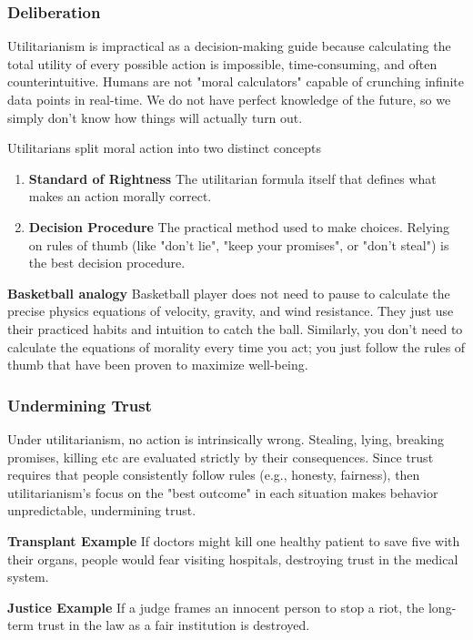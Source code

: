 \documentclass[12pt]{article}
\begin{document}
\subsubsection{Deliberation}
Utilitarianism is impractical as a decision-making guide because calculating the total utility of every possible action is impossible, time-consuming, and often counterintuitive.
Humans are not "moral calculators" capable of crunching infinite data points in real-time.
We do not have perfect knowledge of the future, so we simply don't know how things will actually turn out.

\noindent Utilitarians split moral action into two distinct concepts
\begin{enumerate}
    \item \textbf{Standard of Rightness} The utilitarian formula itself that defines what makes an action morally correct.
    \item \textbf{Decision Procedure} The practical method used to make choices. Relying on rules of thumb (like "don't lie", "keep your promises", or "don't steal") is the best decision procedure.
\end{enumerate}
\textbf{Basketball analogy} Basketball player does not need to pause to calculate the precise physics equations of velocity, gravity, and wind resistance.
They just use their practiced habits and intuition to catch the ball. Similarly, you don't need to calculate the equations of morality every time you act; 
you just follow the rules of thumb that have been proven to maximize well-being.

\subsubsection{Undermining Trust}
Under utilitarianism, no action is intrinsically wrong. Stealing, lying, breaking promises, killing etc are evaluated strictly by their consequences.
Since trust requires that people consistently follow rules (e.g., honesty, fairness), then utilitarianism's focus on the "best outcome" in each situation makes behavior unpredictable, undermining trust.

\noindent\textbf{Transplant Example} If doctors might kill one healthy patient to save five with their organs, people would fear visiting hospitals, destroying trust in the medical system.

\noindent\textbf{Justice Example} If a judge frames an innocent person to stop a riot, the long-term trust in the law as a fair institution is destroyed.
\end{document}
